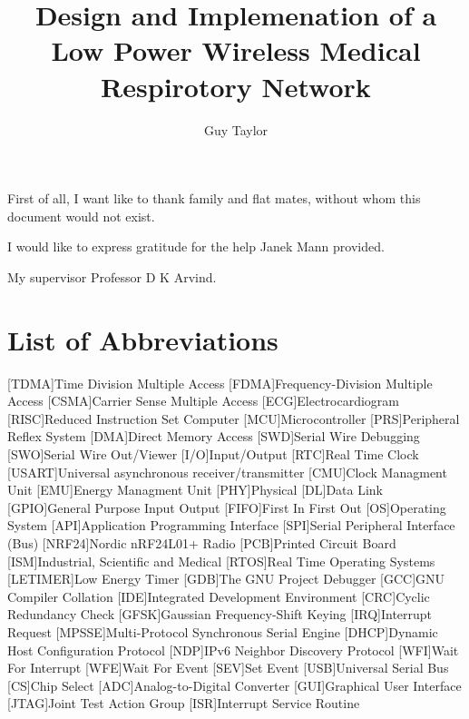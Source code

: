 \documentclass[bsc,logo,plainprepages,parskip,abbrevs,10pt]{infthesis}
\title{Design and Implemenation of a Low Power Wireless Medical Respirotory Network}
\author{Guy Taylor}
\newcommand{\listofabbreviations}{\chapter*{List of Abbreviations}}
\begin{document}
\begin{preliminary}

\maketitle

\begin{acknowledgements}
  First of all, I want like to thank family and flat mates, without whom this document would not exist.
  
  I would like to express gratitude for the help Janek Mann provided.
  
  My supervisor Professor D K Arvind.
\end{acknowledgements}

\standarddeclaration

\tableofcontents

\listoffigures
\listofabbreviations

\begin{acronym}
[TDMA]{Time Division Multiple Access}
[FDMA]{Frequency-Division Multiple Access}
[CSMA]{Carrier Sense Multiple Access}
[ECG]{Electrocardiogram}
[RISC]{Reduced Instruction Set Computer}
[MCU]{Microcontroller}
[PRS]{Peripheral Reflex System}
[DMA]{Direct Memory Access}
[SWD]{Serial Wire Debugging}
[SWO]{Serial Wire Out/Viewer}
[I/O]{Input/Output}
[RTC]{Real Time Clock}
[USART]{Universal asynchronous receiver/transmitter}
[CMU]{Clock Managment Unit}
[EMU]{Energy Managment Unit}
[PHY]{Physical}
[DL]{Data Link}
[GPIO]{General Purpose Input Output}
[FIFO]{First In First Out}
[OS]{Operating System}
[API]{Application Programming Interface}
[SPI]{Serial Peripheral Interface (Bus)}
[NRF24]{Nordic nRF24L01+ Radio}
[PCB]{Printed Circuit Board}
[ISM]{Industrial, Scientific and Medical}
[RTOS]{Real Time Operating Systems}
[LETIMER]{Low Energy Timer}
[GDB]{The GNU Project Debugger}
[GCC]{GNU Compiler Collation}
[IDE]{Integrated Development Environment}
[CRC]{Cyclic Redundancy Check}
[GFSK]{Gaussian Frequency-Shift Keying}
[IRQ]{Interrupt Request}
[MPSSE]{Multi-Protocol Synchronous Serial Engine}
[DHCP]{Dynamic Host Configuration Protocol}
[NDP]{IPv6 Neighbor Discovery Protocol}
[WFI]{Wait For Interrupt}
[WFE]{Wait For Event}
[SEV]{Set Event}
[USB]{Universal Serial Bus}
[CS]{Chip Select}
[ADC]{Analog-to-Digital Converter}
[GUI]{Graphical User Interface}
[JTAG]{Joint Test Action Group}
[ISR]{Interrupt Service Routine}
\end{acronym}

\end{preliminary}
\end{document}
